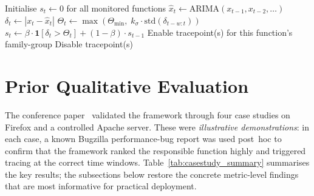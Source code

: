 \documentclass[a4paper,fleqn]{cas-sc}
\theoremstyle{plain}
\begin{document}
\begin{algorithm}[tbp]
  \caption{Online Change Detection and Trace Gating}\label{alg:changedetect}
  \begin{algorithmic}[1]
    \State Initialise $s_t \leftarrow 0$ for all monitored functions
      \State $\hat{x}_t \leftarrow \text{ARIMA}(x_{t-1}, x_{t-2}, \ldots)$
      \State $\delta_t \leftarrow |x_t - \hat{x}_t|$
      \State $\Theta_t \leftarrow \max(\Theta_{\min},\; k_\sigma \cdot \mathrm{std}(\delta_{t-w:t}))$
      \State $s_t \leftarrow \beta \cdot \mathbf{1}[\delta_t > \Theta_t] + (1-\beta)\cdot s_{t-1}$
        \State Enable tracepoint(s) for this function's family-group
      \Else
        \State Disable tracepoint(s)
      \EndIf
    \EndFor
  \end{algorithmic}
\end{algorithm}

\section{Prior Qualitative Evaluation}\label{sec:casestudies}

The conference paper~\cite{10197790} validated the framework through four
case studies on Firefox and a controlled Apache server.
These were \emph{illustrative demonstrations}: in each case, a known Bugzilla
performance-bug report was used post~hoc to confirm that the framework ranked
the responsible function highly and triggered tracing at the correct time
windows.
Table~\ref{tab:casestudy_summary} summarises the key results; the subsections
below restore the concrete metric-level findings that are most informative
for practical deployment.

\begin{table}[tbp]
\centering
{}
\caption{Summary of four qualitative case studies from~\protect\cite{10197790}.
  All overhead reductions are relative to always-on monitoring of the
  full candidate set.}
\label{tab:casestudy_summary}
\end{table}
\end{document}

